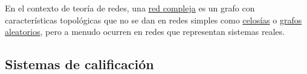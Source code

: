 \begin{definicion}\label{def:CN}
En el contexto de teoría de redes, una \href{https://en.wikipedia.org/wiki/Complex_network}{red compleja} 
es un grafo con características topológicas que no se dan 
en redes simples como \href{https://en.wikipedia.org/wiki/Lattice_(order)}{celosías} o 
\href{https://mathworld.wolfram.com/RandomGraph.html}{grafos aleatorios}, pero a menudo ocurren en redes que 
representan sistemas reales. 


\end{definicion}




\subsection{Sistemas de calificación}

